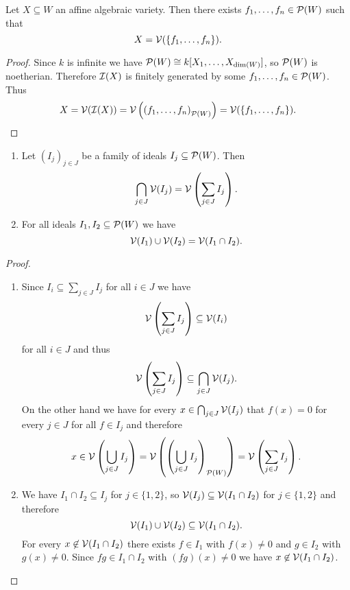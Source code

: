 \begin{cor}
  Let $X \subseteq W$ an affine algebraic variety. Then there exists $f_1, \dotsc, f_n \in \mathcal{P}(W)$ such that
  \[
    X = \mathcal{V}(\{f_1, \dotsc, f_n\}).
  \]
\end{cor}
\begin{proof}
  Since $k$ is infinite we have $\mathcal{P}(W) \cong k[X_1, \dotsc, X_{\dim(W)}]$, so $\mathcal{P}(W)$ is noetherian. Therefore $\mathcal{I}(X)$ is finitely generated by some $f_1, \dotsc, f_n \in \mathcal{P}(W)$. Thus
  \[
    X
    = \mathcal{V}(\mathcal{I}(X))
    = \mathcal{V}\left(\left(f_1, \dotsc, f_n\right)_{\mathcal{P}(W)}\right)
    = \mathcal{V}(\{f_1, \dotsc, f_n\}).
    \qedhere
  \]
\end{proof}


\begin{prop}
  \begin{enumerate}[label=\emph{\alph*)},leftmargin=*]
    \item
      Let $(I_j)_{j \in J}$ be a family of ideals $I_j \subseteq \mathcal{P}(W)$. Then
      \[
        \bigcap_{j \in J} \mathcal{V}(I_j) = \mathcal{V}\left( \sum_{j \in J} I_j \right).
      \]
    \item
      For all ideals $I_1, I_2 \subseteq \mathcal{P}(W)$ we have
      \[
        \mathcal{V}(I_1) \cup \mathcal{V}(I_2) = \mathcal{V}(I_1 \cap I_2).
      \]
  \end{enumerate}
\end{prop}
\begin{proof}
  \begin{enumerate}[label=\emph{\alph*)},leftmargin=*]
    \item
      Since $I_i \subseteq \sum_{j \in J} I_j$ for all $i \in J$ we have
      \[
        \mathcal{V}\left( \sum_{j \in J} I_j \right) \subseteq \mathcal{V}(I_i)
      \]
      for all $i \in J$ and thus
      \[
        \mathcal{V}\left( \sum_{j \in J} I_j \right) \subseteq \bigcap_{j \in J} \mathcal{V}(I_j).
      \]
      On the other hand we have for every $x \in \bigcap_{j \in J} \mathcal{V}(I_j)$ that $f(x) = 0$ for every $j \in J$ for all $f \in I_j$ and therefore
      \[
        x
        \in \mathcal{V}\left( \bigcup_{j \in J} I_j \right)
        = \mathcal{V}\left( \left( \bigcup_{j \in J} I_j \right)_{\mathcal{P}(W)} \right)
        = \mathcal{V}\left( \sum_{j \in J} I_j \right).
      \]
    \item
      We have $I_1 \cap I_2 \subseteq I_j$ for $j \in \{1,2\}$, so $\mathcal{V}(I_j) \subseteq \mathcal{V}(I_1 \cap I_2)$ for $j \in \{1,2\}$ and therefore
      \[
        \mathcal{V}(I_1) \cup \mathcal{V}(I_2) \subseteq \mathcal{V}(I_1 \cap I_2).
      \]
      For every $x \not\in \mathcal{V}(I_1 \cap I_2)$ there exists $f \in I_1$ with $f(x) \neq 0$ and $g \in I_2$ with $g(x) \neq 0$. Since $fg \in I_1 \cap I_2$ with $(fg)(x) \neq 0$ we have $x \not\in \mathcal{V}(I_1 \cap I_2)$.
    \qedhere
  \end{enumerate}
\end{proof}



